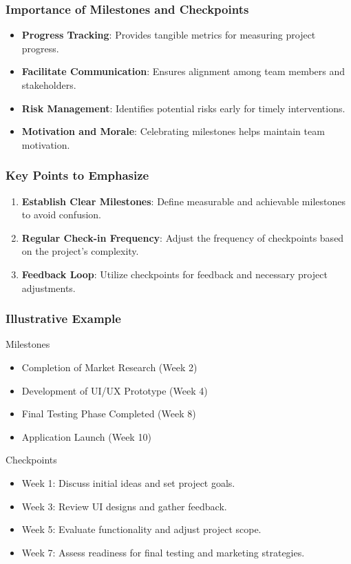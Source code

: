 \documentclass[aspectratio=169]{beamer}
\begin{document}
\begin{frame}[fragile]
    \frametitle{Importance of Milestones and Checkpoints}
    \begin{itemize}
        \item \textbf{Progress Tracking}: Provides tangible metrics for measuring project progress.
        \item \textbf{Facilitate Communication}: Ensures alignment among team members and stakeholders.
        \item \textbf{Risk Management}: Identifies potential risks early for timely interventions.
        \item \textbf{Motivation and Morale}: Celebrating milestones helps maintain team motivation.
    \end{itemize}
\end{frame}

\begin{frame}[fragile]
    \frametitle{Key Points to Emphasize}
    \begin{enumerate}
        \item \textbf{Establish Clear Milestones}: Define measurable and achievable milestones to avoid confusion.
        \item \textbf{Regular Check-in Frequency}: Adjust the frequency of checkpoints based on the project's complexity.
        \item \textbf{Feedback Loop}: Utilize checkpoints for feedback and necessary project adjustments.
    \end{enumerate}
\end{frame}

\begin{frame}[fragile]
    \frametitle{Illustrative Example}
    \begin{block}{Milestones}
        \begin{itemize}
            \item Completion of Market Research (Week 2)
            \item Development of UI/UX Prototype (Week 4)
            \item Final Testing Phase Completed (Week 8)
            \item Application Launch (Week 10)
        \end{itemize}
    \end{block}
    
    \begin{block}{Checkpoints}
        \begin{itemize}
            \item Week 1: Discuss initial ideas and set project goals.
            \item Week 3: Review UI designs and gather feedback.
            \item Week 5: Evaluate functionality and adjust project scope.
            \item Week 7: Assess readiness for final testing and marketing strategies.
        \end{itemize}
    \end{block}
\end{frame}
\end{document}
